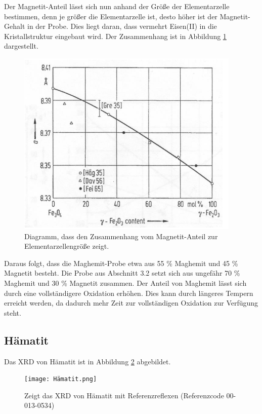 \documentclass[12pt, a4paper]{article}
\begin{document}
\noindent
Der Magnetit-Anteil lässt sich nun anhand der Größe der Elementarzelle bestimmen, denn je größer die Elementarzelle ist, desto höher ist der Magnetit-Gehalt in der Probe. Dies liegt daran, dass vermehrt Eisen(II) in die Kristallstruktur eingebaut wird. Der Zusammenhang ist in Abbildung \ref{diagramm} dargestellt.

\begin{figure}[!h]
    \centering
    \includegraphics{diagramm.png}
    \caption{Diagramm, dass den Zusammenhang vom Magnetit-Anteil zur Elementarzellengröße zeigt.}
    \label{diagramm}
\end{figure}

\noindent
Daraus folgt, dass die Maghemit-Probe etwa aus 55 \% Maghemit und 45 \% Magnetit besteht. Die Probe aus Abschnitt 3.2 setzt sich aus ungefähr 70 \% Maghemit und 30 \% Magnetit zusammen.
Der Anteil von Maghemit lässt sich durch eine vollständigere Oxidation erhöhen. Dies kann durch längeres Tempern erreicht werden, da dadurch mehr Zeit zur vollständigen Oxidation zur Verfügung steht.

\newpage

\subsection{Hämatit}
Das XRD von Hämatit ist in Abbildung \ref{xrdhämatit} abgebildet.

\begin{figure}[!h]
    \texttt{[image: Hämatit.png]}
    \caption{Zeigt das XRD von Hämatit mit Referenzreflexen (Referenzcode 00-013-0534)}
    \label{xrdhämatit}
\end{figure}
\end{document}
